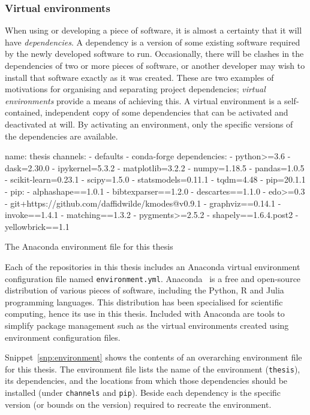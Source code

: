 \subsubsection{Virtual environments}

When using or developing a piece of software, it is almost a certainty that it
will have \emph{dependencies}. A dependency is a version of some existing
software required by the newly developed software to run. Occasionally, there
will be clashes in the dependencies of two or more pieces of software, or
another developer may wish to install that software exactly as it was created.
These are two examples of motivations for organising and separating project
dependencies; \emph{virtual environments} provide a means of achieving this. A
virtual environment is a self-contained, independent copy of some dependencies
that can be activated and deactivated at will. By activating an environment,
only the specific versions of the dependencies are available.

\begin{listing}[htbp]
\begin{sourceyml}
name: thesis
channels:
- defaults
- conda-forge
dependencies:
 - python>=3.6
 - dask=2.30.0
 - ipykernel=5.3.2
 - matplotlib=3.2.2
 - numpy=1.18.5
 - pandas=1.0.5
 - scikit-learn=0.23.1
 - scipy=1.5.0
 - statsmodels=0.11.1
 - tqdm=4.48
 - pip=20.1.1
 - pip:
   - alphashape==1.0.1
   - bibtexparser==1.2.0
   - descartes==1.1.0
   - edo>=0.3
   - git+https://github.com/daffidwilde/kmodes@v0.9.1
   - graphviz==0.14.1
   - invoke==1.4.1
   - matching==1.3.2
   - pygments>=2.5.2
   - shapely==1.6.4.post2
   - yellowbrick==1.1
\end{sourceyml}
\caption{The Anaconda environment file for this thesis}\label{snp:environment}
\end{listing}

Each of the repositories in this thesis includes an Anaconda virtual environment
configuration file named \texttt{environment.yml}.
Anaconda~\cite{anaconda} is a free and open-source distribution of various
pieces of software, including the Python, R and Julia programming languages.
This distribution has been specialised for scientific computing, hence its use
in this thesis. Included with Anaconda are tools to simplify package management
such as the virtual environments created using environment configuration files.

Snippet~\ref{snp:environment} shows the contents of an overarching environment
file for this thesis. The environment file lists the name of the environment
(\texttt{thesis}), its dependencies, and the locations from which
those dependencies should be installed (under \texttt{channels} and
\texttt{pip}). Beside each dependency is the specific version (or
bounds on the version) required to recreate the environment.


